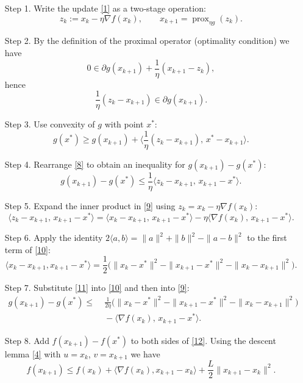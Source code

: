 \documentclass{article}
\newcommand{\prox}{\operatorname{prox}}
\begin{document}
\begin{enumerate}
\item[Step 1.]  Write the update \eqref{1} as a two‑stage operation:
\[
z_{k}:=x_{k}-\eta\nabla f(x_{k}),\qquad
x_{k+1}= \prox_{\eta g}(z_{k}). \tag{6}
\]

\item[Step 2.]  By the definition of the proximal operator (optimality condition) we have
\[
0\in \partial g(x_{k+1})+\frac{1}{\eta}(x_{k+1}-z_{k}),
\]
hence
\[
\frac{1}{\eta}(z_{k}-x_{k+1})\in\partial g(x_{k+1}). \tag{7}
\]

\item[Step 3.]  Use convexity of $g$ with point $x^{*}$:
\[
g(x^{*})\ge g(x_{k+1})+\Big\langle \frac{1}{\eta}(z_{k}-x_{k+1}),\,x^{*}-x_{k+1}\Big\rangle.
\tag{8}
\]

\item[Step 4.]  Rearrange \eqref{8} to obtain an inequality for $g(x_{k+1})-g(x^{*})$:
\[
g(x_{k+1})-g(x^{*})\le
\frac{1}{\eta}\langle z_{k}-x_{k+1},\,x_{k+1}-x^{*}\rangle.
\tag{9}
\]

\item[Step 5.]  Expand the inner product in \eqref{9} using $z_{k}=x_{k}-\eta\nabla f(x_{k})$:
\[
\langle z_{k}-x_{k+1},\,x_{k+1}-x^{*}\rangle
= \langle x_{k}-x_{k+1},\,x_{k+1}-x^{*}\rangle
-\eta\langle\nabla f(x_{k}),\,x_{k+1}-x^{*}\rangle.
\tag{10}
\]

\item[Step 6.]  Apply the identity $2\langle a,b\rangle=\|a\|^{2}+\|b\|^{2}-\|a-b\|^{2}$ to the first term of \eqref{10}:
\[
\langle x_{k}-x_{k+1},x_{k+1}-x^{*}\rangle
=\frac{1}{2}\Big(\|x_{k}-x^{*}\|^{2}-\|x_{k+1}-x^{*}\|^{2}-\|x_{k}-x_{k+1}\|^{2}\Big).
\tag{11}
\]

\item[Step 7.]  Substitute \eqref{11} into \eqref{10} and then into \eqref{9}:
\[
\begin{aligned}
g(x_{k+1})-g(x^{*})
\le &\;\frac{1}{2\eta}\Big(\|x_{k}-x^{*}\|^{2}-\|x_{k+1}-x^{*}\|^{2}
-\|x_{k}-x_{k+1}\|^{2}\Big)\\
&\;-\langle\nabla f(x_{k}),\,x_{k+1}-x^{*}\rangle.
\end{aligned}
\tag{12}
\]

\item[Step 8.]  Add $f(x_{k+1})-f(x^{*})$ to both sides of \eqref{12}. Using the descent lemma \eqref{4} with $u=x_{k}$, $v=x_{k+1}$ we have
\[
f(x_{k+1})\le f(x_{k})+\langle\nabla f(x_{k}),x_{k+1}-x_{k}\rangle
+\frac{L}{2}\|x_{k+1}-x_{k}\|^{2}.
\tag{13}
\]


\end{enumerate}
\end{document}
